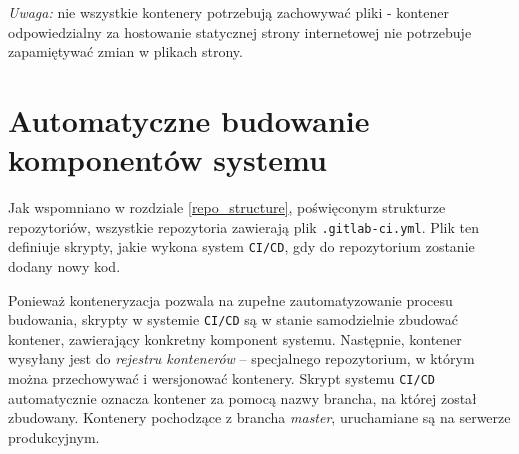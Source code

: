 \textit{Uwaga:} nie wszystkie kontenery potrzebują zachowywać pliki - kontener
odpowiedzialny za hostowanie statycznej strony internetowej nie potrzebuje
zapamiętywać zmian w plikach strony. 

\section{Automatyczne budowanie komponentów systemu}

Jak wspomniano w rozdziale \ref{repo_structure}, poświęconym strukturze repozytoriów,
wszystkie repozytoria zawierają plik \texttt{.gitlab-ci.yml}. Plik ten definiuje skrypty,
jakie wykona system \texttt{CI/CD}, gdy do repozytorium zostanie dodany nowy kod.

Ponieważ konteneryzacja pozwala na zupełne zautomatyzowanie procesu budowania,
skrypty w systemie \texttt{CI/CD} są w stanie samodzielnie zbudować kontener,
zawierający konkretny komponent systemu. Następnie, kontener wysyłany jest
do \textit{rejestru kontenerów} -- specjalnego repozytorium, w którym można
przechowywać i wersjonować kontenery. Skrypt systemu \texttt{CI/CD} automatycznie oznacza
kontener za pomocą nazwy brancha, na której został zbudowany. Kontenery pochodzące
z brancha \textit{master}, uruchamiane są na serwerze produkcyjnym.

